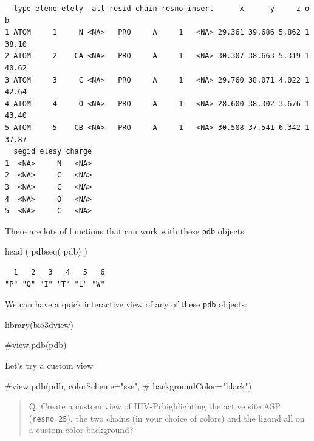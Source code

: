 \documentclass[
  letterpaper,
  DIV=11,
  numbers=noendperiod]{scrartcl}
\newenvironment{Shaded}{\begin{snugshade}}{\end{snugshade}}
\newcommand{\CommentTok}[1]{\textcolor[rgb]{0.37,0.37,0.37}{#1}}
\newcommand{\FunctionTok}[1]{\textcolor[rgb]{0.28,0.35,0.67}{#1}}
\newcommand{\NormalTok}[1]{\textcolor[rgb]{0.00,0.23,0.31}{#1}}
\begin{document}
\begin{verbatim}
  type eleno elety  alt resid chain resno insert      x      y     z o     b
1 ATOM     1     N <NA>   PRO     A     1   <NA> 29.361 39.686 5.862 1 38.10
2 ATOM     2    CA <NA>   PRO     A     1   <NA> 30.307 38.663 5.319 1 40.62
3 ATOM     3     C <NA>   PRO     A     1   <NA> 29.760 38.071 4.022 1 42.64
4 ATOM     4     O <NA>   PRO     A     1   <NA> 28.600 38.302 3.676 1 43.40
5 ATOM     5    CB <NA>   PRO     A     1   <NA> 30.508 37.541 6.342 1 37.87
  segid elesy charge
1  <NA>     N   <NA>
2  <NA>     C   <NA>
3  <NA>     C   <NA>
4  <NA>     O   <NA>
5  <NA>     C   <NA>
\end{verbatim}

There are lots of functions that can work with these \texttt{pdb}
objects

\begin{Shaded}
\begin{Highlighting}[]
\FunctionTok{head}\NormalTok{ ( }\FunctionTok{pdbseq}\NormalTok{( pdb) )}
\end{Highlighting}
\end{Shaded}

\begin{verbatim}
  1   2   3   4   5   6 
"P" "Q" "I" "T" "L" "W" 
\end{verbatim}

We can have a quick interactive view of any of these \texttt{pdb}
objects:

\begin{Shaded}
\begin{Highlighting}[]
\FunctionTok{library}\NormalTok{(bio3dview)}

\CommentTok{\#view.pdb(pdb)}
\end{Highlighting}
\end{Shaded}

Let's try a custom view

\begin{Shaded}
\begin{Highlighting}[]
\CommentTok{\#view.pdb(pdb, colorScheme="sse",}
\CommentTok{\#         backgroundColor="black")}
\end{Highlighting}
\end{Shaded}

\begin{quote}
Q. Create a custom view of HIV-Prhighlighting the active site ASP
(\texttt{resno=25}), the two chains (in your choice of colors) and the
ligand all on a custom color background?
\end{quote}
\end{document}
